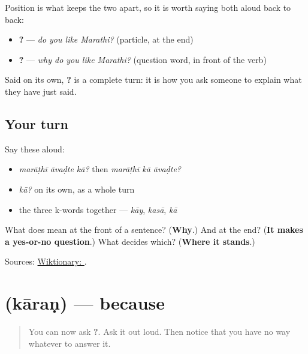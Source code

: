 Position is what keeps the two apart, so it is worth saying both aloud back to back:

\begin{itemize}
\raggedright
  \item \textbf{  ?} — \emph{do you like Marathi?} (particle, at the end)
  \item \textbf{  ?} — \emph{why do you like Marathi?} (question word, in front of the verb)
\end{itemize}

Said on its own, \textbf{?} is a complete turn: it is how you ask someone to explain what they have just said.

\subsection*{Your turn}
Say these aloud:

\begin{itemize}
\raggedright
  \item \emph{marāṭhī āvaḍte kā?} then \emph{marāṭhī kā āvaḍte?}
  \item \emph{kā?} on its own, as a whole turn
  \item the three k-words together — \emph{kāy}, \emph{kasā}, \emph{kā}
\end{itemize}

\begin{tcolorbox}[breakable,colback=teal!4,colframe=teal!35!black,title={Before you move on}]
What does \textbf{} mean at the front of a sentence? (\textbf{Why}.) And at the end? (\textbf{It makes a yes-or-no question}.) What decides which? (\textbf{Where it stands}.)

Sources: \href{https://en.wiktionary.org/wiki/\%E0\%A4\%95\%E0\%A4\%BE}{Wiktionary: }.
\end{tcolorbox}
\section[\texorpdfstring{\mr{कारण} (kāraṇ)}{कारण (kāraṇ)}]{ (kāraṇ) — because}

\label{lesson:MR-C34-kaaran}



\begin{quote}
You can now ask \textbf{?}. Ask it out loud. Then notice that you have no way whatever to answer it.
\end{quote}


